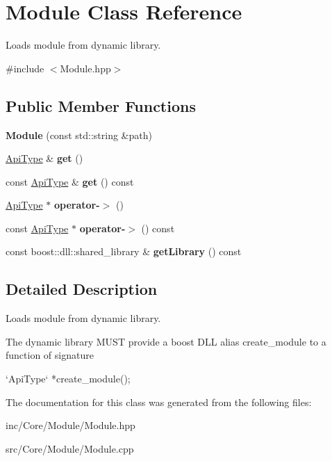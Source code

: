\hypertarget{classModule}{}\section{Module Class Reference}
\label{classModule}


Loads module from dynamic library.  




{\ttfamily \#include $<$Module.\+hpp$>$}

\subsection*{Public Member Functions}
\begin{DoxyCompactItemize}
\item 
\mbox{\label{classModule_a1f7e6ae9be9168b287c355b5160cea7b}} 
{\bfseries Module} (const std\+::string \&path)
\item 
\mbox{\label{classModule_a57b5394e3c8a21cdade52255ed59cefc}} 
\hyperlink{structmodule_1_1Api}{Api\+Type} \& {\bfseries get} ()
\item 
\mbox{\label{classModule_a62490216d6f3d013ad51df7ff873e884}} 
const \hyperlink{structmodule_1_1Api}{Api\+Type} \& {\bfseries get} () const
\item 
\mbox{\label{classModule_a9cc54514b4135990fccef2176f847749}} 
\hyperlink{structmodule_1_1Api}{Api\+Type} $\ast$ {\bfseries operator-\/$>$} ()
\item 
\mbox{\label{classModule_a076c605faaac3b0a58690f070ea39aa8}} 
const \hyperlink{structmodule_1_1Api}{Api\+Type} $\ast$ {\bfseries operator-\/$>$} () const
\item 
\mbox{\label{classModule_aa8cecdcb3cff969c9255a650035c261b}} 
const boost\+::dll\+::shared\+\_\+library \& {\bfseries get\+Library} () const
\end{DoxyCompactItemize}


\subsection{Detailed Description}
Loads module from dynamic library. 

The dynamic library M\+U\+ST provide a boost D\+LL alias {\ttfamily create\+\_\+module} to a function of signature


\begin{DoxyCode}
`ApiType` *create\_module();
\end{DoxyCode}
 

The documentation for this class was generated from the following files\+:\begin{DoxyCompactItemize}
\item 
inc/\+Core/\+Module/Module.\+hpp\item 
src/\+Core/\+Module/Module.\+cpp\end{DoxyCompactItemize}
